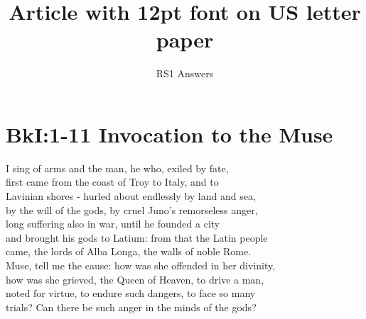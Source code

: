 \documentclass[12pt, usletter, titlepage]{article}
\title{Article with 12pt font on US letter paper}
\author{RS1 Answers}
\date{}
\begin{document}
\maketitle

\section*{BkI:1-11 Invocation to the Muse}
I sing of arms and the man, he who, exiled by fate,\\
first came from the coast of Troy to Italy, and to\\
Lavinian shores - hurled about endlessly by land and sea,\\
by the will of the gods, by cruel Juno's remorseless anger,\\
long suffering also in war, until he founded a city\\
and brought his gods to Latium: from that the Latin people\\
came, the lords of Alba Longa, the walls of noble Rome.\\
Muse, tell me the cause: how was she offended in her divinity,\\
how was she grieved, the Queen of Heaven, to drive a man,\\
noted for virtue, to endure such dangers, to face so many\\
trials? Can there be such anger in the minds of the gods?

\end{document}
